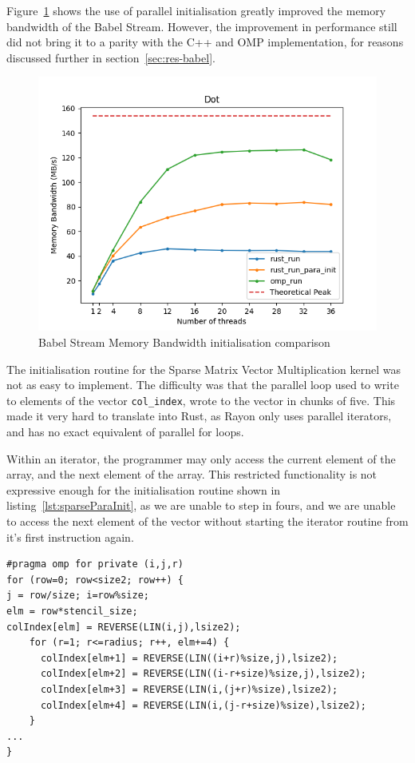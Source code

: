 Figure~\ref{fig:babel-dot-init} shows the use of parallel initialisation greatly improved the memory bandwidth of the Babel Stream. However, the improvement in performance still did not bring it to a parity with the C++ and OMP implementation, for reasons discussed further in section~\ref{sec:res-babel}.

\begin{figure}[H]
    \centering
    \includegraphics[width=.8\linewidth]{figs/babel/dot-init.png}
    \caption{Babel Stream Memory Bandwidth initialisation comparison}
    \label{fig:babel-dot-init}
\end{figure}


The initialisation routine for the Sparse Matrix Vector Multiplication kernel was not as easy to implement. The difficulty was that the parallel loop used to write to elements of the vector \texttt{col\_index}, wrote to the vector in chunks of five. This made it very hard to translate into Rust, as Rayon only uses parallel iterators, and has no exact equivalent of parallel for loops.

Within an iterator, the programmer may only access the current element of the array, and the next element of the array. This restricted functionality is not expressive enough for the initialisation routine shown in listing~\ref{lst:sparseParaInit}, as we are unable to step in fours, and we are unable to access the next element of the vector without starting the iterator routine from it's first instruction again.


\begin{code}
\begin{verbatim}
#pragma omp for private (i,j,r)
for (row=0; row<size2; row++) {
j = row/size; i=row%size;
elm = row*stencil_size;
colIndex[elm] = REVERSE(LIN(i,j),lsize2);
    for (r=1; r<=radius; r++, elm+=4) {
      colIndex[elm+1] = REVERSE(LIN((i+r)%size,j),lsize2);
      colIndex[elm+2] = REVERSE(LIN((i-r+size)%size,j),lsize2);
      colIndex[elm+3] = REVERSE(LIN(i,(j+r)%size),lsize2);
      colIndex[elm+4] = REVERSE(LIN(i,(j-r+size)%size),lsize2);
    }
...
}
\end{verbatim}
\label{lst:sparseParaInit}
\end{code}

